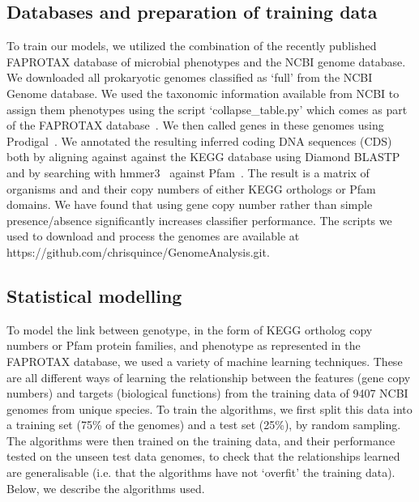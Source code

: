 \documentclass[10pt,letterpaper]{article}
\begin{document}
\subsection*{Databases and preparation of training data}
To train our models, we utilized the combination of the recently published FAPROTAX database of microbial phenotypes and the NCBI genome database. We downloaded all prokaryotic genomes classified as `full' from the NCBI Genome database. We used the taxonomic information available from NCBI to assign them phenotypes using the script `collapse\_table.py' which comes as part of the FAPROTAX database~\cite{Louca2016}. We then called genes in these genomes using Prodigal~\cite{Hyatt2010}. We annotated the resulting inferred coding DNA sequences (CDS) both by aligning against against the KEGG database using Diamond BLASTP~\cite{Buchfink2014} and by searching with hmmer3~\cite{Eddy2011} against Pfam~\cite{Finn2016}. The result is a matrix of organisms and and their copy numbers of either KEGG orthologs or Pfam domains. We have found that using gene copy number rather than simple presence/absence significantly increases classifier performance. The scripts we used to download and process the genomes are available at https://github.com/chrisquince/GenomeAnalysis.git.

\subsection*{Statistical modelling}
To model the link between genotype, in the form of KEGG ortholog copy numbers or Pfam protein families, and phenotype as represented in the FAPROTAX database, we used a variety of machine learning techniques. These are all different ways of learning the relationship between the features (gene copy numbers) and targets (biological functions) from the training data of 9407 NCBI genomes from unique species. To train the algorithms, we first split this data into a training set (75\% of the genomes) and a test set (25\%), by random sampling. The algorithms were then trained on the training data, and their performance tested on the unseen test data genomes, to check that the relationships learned are generalisable (i.e. that the algorithms have not `overfit' the training data). Below, we describe the algorithms used.
\end{document}
